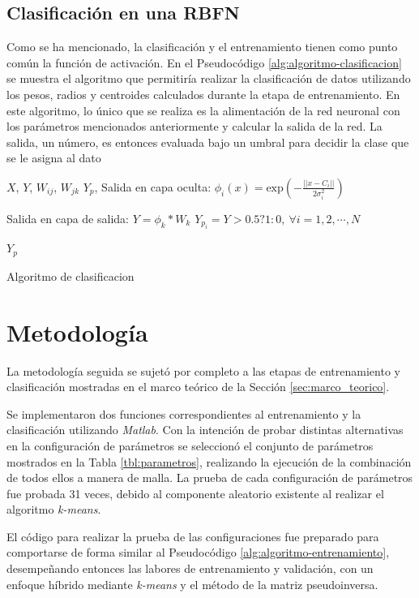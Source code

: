 \documentclass[journal]{IEEEtran}
\begin{document}
\subsection{Clasificación en una RBFN} %
\label{sub:clasificaci_n_en_una_rna}
Como se ha mencionado, la clasificación y el entrenamiento tienen como punto común la función de activación.
En el Pseudocódigo \ref{alg:algoritmo-clasificacion} se muestra el algoritmo que permitiría realizar la clasificación de datos utilizando los pesos, radios y centroides calculados durante la etapa de entrenamiento.
En este algoritmo, lo único que se realiza es la alimentación de la red neuronal con los parámetros mencionados anteriormente y calcular la salida de la red.
La salida, un número, es entonces evaluada bajo un umbral para decidir la clase que se le asigna al dato


\begin{algorithm} 
\footnotesize
\begin{algorithmic}[1] 
\REQUIRE  $X$, $Y$, $W_{ij}$, $W_{jk}$
\ENSURE $Y_p$, 
\STATE Salida en capa oculta:
\STATE $\phi_i (x) = \text{exp}(-\frac{||x-C_i||}{2\sigma_i^2})$

\STATE Salida en capa de salida:
\STATE $Y = \phi _k * W_k$
\STATE $Y_{p_i} = Y > 0.5? 1 : 0, ~\forall i = 1,2,\cdots,N$

\RETURN $Y_p$
\end{algorithmic} 
\caption{Algoritmo de clasificacion} 
\label{alg:algoritmo-clasificacion}
\end{algorithm}

\section{Metodología}
\label{sec:metodologia}
La metodología seguida se sujetó por completo a las etapas de entrenamiento y clasificación mostradas en el marco teórico de la Sección \ref{sec:marco_teorico}.

Se implementaron dos funciones correspondientes al entrenamiento y la clasificación utilizando \emph{Matlab}.
Con la intención de probar distintas alternativas en la configuración de parámetros se  seleccionó el conjunto de parámetros mostrados en la Tabla \ref{tbl:parametros}, realizando la ejecución de la combinación de todos ellos a manera de malla.
La prueba de cada configuración de parámetros fue probada 31 veces, debido al componente aleatorio existente al realizar el algoritmo \emph{k-means}.

El código para realizar la prueba de las configuraciones fue preparado para comportarse de forma similar al Pseudocódigo \ref{alg:algoritmo-entrenamiento}, desempeñando entonces las labores de entrenamiento y validación, con un enfoque híbrido mediante \emph{k-means} y el método de la matriz pseudoinversa.
\end{document}
